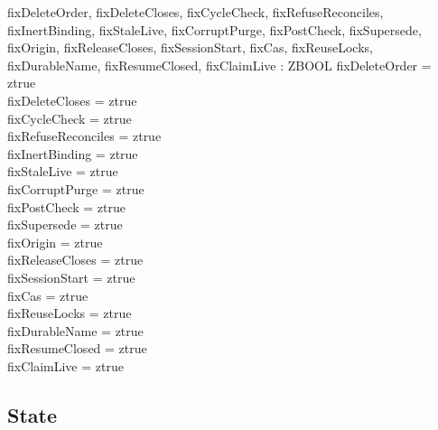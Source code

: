 \documentclass[a4paper,10pt,fleqn]{article}
\begin{document}
\begin{axdef}
fixDeleteOrder, fixDeleteCloses, fixCycleCheck, fixRefuseReconciles, fixInertBinding, fixStaleLive, fixCorruptPurge, fixPostCheck, fixSupersede, fixOrigin, fixReleaseCloses, fixSessionStart, fixCas, fixReuseLocks, fixDurableName, fixResumeClosed, fixClaimLive : ZBOOL
\where
fixDeleteOrder = ztrue \\
fixDeleteCloses = ztrue \\
fixCycleCheck = ztrue \\
fixRefuseReconciles = ztrue \\
fixInertBinding = ztrue \\
fixStaleLive = ztrue \\
fixCorruptPurge = ztrue \\
fixPostCheck = ztrue \\
fixSupersede = ztrue \\
fixOrigin = ztrue \\
fixReleaseCloses = ztrue \\
fixSessionStart = ztrue \\
fixCas = ztrue \\
fixReuseLocks = ztrue \\
fixDurableName = ztrue \\
fixResumeClosed = ztrue \\
fixClaimLive = ztrue
\end{axdef}

\subsection{State}
\label{sec:lc-state}
\end{document}
